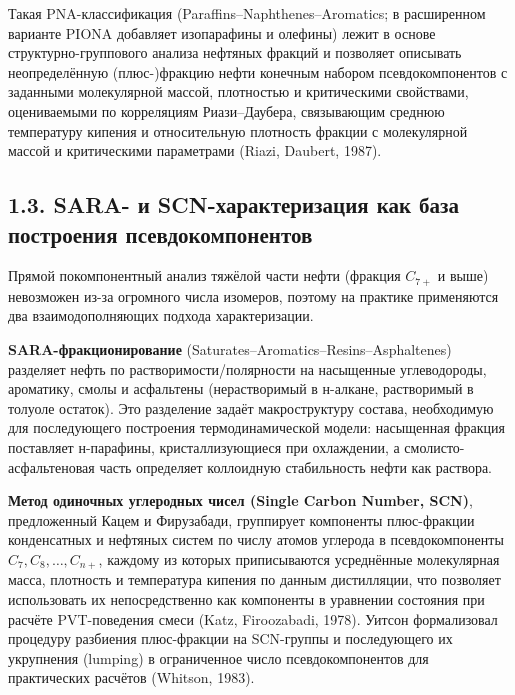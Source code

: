 \documentclass[11pt]{extarticle}
\begin{document}
Такая PNA-классификация (Paraffins--Naphthenes--Aromatics; в расширенном варианте PIONA добавляет изопарафины и олефины) лежит в основе структурно-группового анализа нефтяных фракций и позволяет описывать неопределённую (плюс-)фракцию нефти конечным набором псевдокомпонентов с заданными молекулярной массой, плотностью и критическими свойствами, оцениваемыми по корреляциям Риази--Даубера, связывающим среднюю температуру кипения и относительную плотность фракции с молекулярной массой и критическими параметрами (Riazi, Daubert, 1987).

\subsection{1.3. SARA- и SCN-характеризация как база построения псевдокомпонентов}\label{sara--ux438-scn-ux445ux430ux440ux430ux43aux442ux435ux440ux438ux437ux430ux446ux438ux44f-ux43aux430ux43a-ux431ux430ux437ux430-ux43fux43eux441ux442ux440ux43eux435ux43dux438ux44f-ux43fux441ux435ux432ux434ux43eux43aux43eux43cux43fux43eux43dux435ux43dux442ux43eux432}

Прямой покомпонентный анализ тяжёлой части нефти (фракция \(C_{7+}\) и выше) невозможен из-за огромного числа изомеров, поэтому на практике применяются два взаимодополняющих подхода характеризации.

\textbf{SARA-фракционирование} (Saturates--Aromatics--Resins--Asphaltenes) разделяет нефть по растворимости/полярности на насыщенные углеводороды, ароматику, смолы и асфальтены (нерастворимый в н-алкане, растворимый в толуоле остаток). Это разделение задаёт макроструктуру состава, необходимую для последующего построения термодинамической модели: насыщенная фракция поставляет н-парафины, кристаллизующиеся при охлаждении, а смолисто-асфальтеновая часть определяет коллоидную стабильность нефти как раствора.

\textbf{Метод одиночных углеродных чисел (Single Carbon Number, SCN)}, предложенный Кацем и Фирузабади, группирует компоненты плюс-фракции конденсатных и нефтяных систем по числу атомов углерода в псевдокомпоненты \(C_7, C_8, \dots, C_{n+}\), каждому из которых приписываются усреднённые молекулярная масса, плотность и температура кипения по данным дистилляции, что позволяет использовать их непосредственно как компоненты в уравнении состояния при расчёте PVT-поведения смеси (Katz, Firoozabadi, 1978). Уитсон формализовал процедуру разбиения плюс-фракции на SCN-группы и последующего их укрупнения (lumping) в ограниченное число псевдокомпонентов для практических расчётов (Whitson, 1983).
\end{document}
